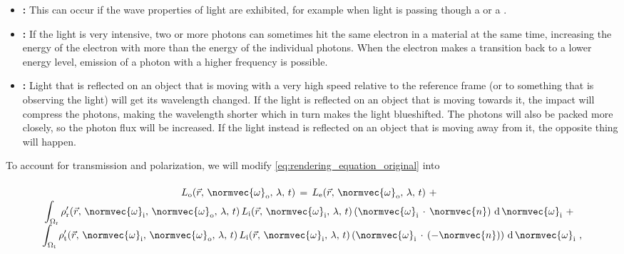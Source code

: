 {\begin{itemize}
If the absorption and the emission occurs at the same point in time, but with different frequencies, this is called .
    
\item \textbf{:} This can occur if the wave properties of light are exhibited, for example when light is passing though a  or a .
    
\item \textbf{:} If the light is very intensive, two or more photons can sometimes hit the same electron in a material at the same time, increasing the energy of the electron with more than the energy of the individual photons. When the electron makes a transition back to a lower energy level, emission of a photon with a higher frequency is possible.
    
\item \textbf{:} Light that is reflected on an object that is moving with a very high speed relative to the reference frame (or to something that is observing the light) will get its wavelength changed. If the light is reflected on an object that is moving towards it, the impact will compress the photons, making the wavelength shorter which in turn makes the light blueshifted. The photons will also be packed more closely, so the photon flux will be increased. If the light instead is reflected on an object that is moving away from it, the opposite thing will happen.
\end{itemize}

To account for transmission and polarization, we will modify \eqref{eq:rendering_equation_original} into

\begin{equation} \label{eq:rendering_equation_improved}
\renewcommand*{\arraystretch}{1.5}
\begin{array}{cl}
L_{\text{o}}(\vec{r},\,\normvec{\omega}_{\text{o}},\, \lambda,\, t) \,=\, L_{\text{e}}(\vec{r},\, \normvec{\omega}_{\text{o}},\, \lambda,\, t) \ + \\
\displaystyle \int_{\Omega_{\text{r}}} \rho'_{\text{r}}(\vec{r},\, \normvec{\omega}_{\text{i}},\, \normvec{\omega}_{\text{o}},\, \lambda,\, t)\, L_{\text{i}}(\vec{r},\, \normvec{\omega}_{\text{i}},\, \lambda,\, t)\, (\normvec{\omega}_{\text{i}}\,\cdot\,\normvec{n})\, \operatorname d \normvec{\omega}_{\text{i}} \ + \\
\displaystyle \int_{\Omega_{\text{t}}} \rho'_{\text{t}}(\vec{r},\, \normvec{\omega}_{\text{i}},\, \normvec{\omega}_{\text{o}},\, \lambda,\, t)\, L_{\text{i}}(\vec{r},\, \normvec{\omega}_{\text{i}},\, \lambda,\, t)\, (\normvec{\omega}_{\text{i}}\,\cdot\,(-\normvec{n}))\, \operatorname d \normvec{\omega}_{\text{i}} & \!\!\!\! ,
\end{array}
\end{equation}

}
